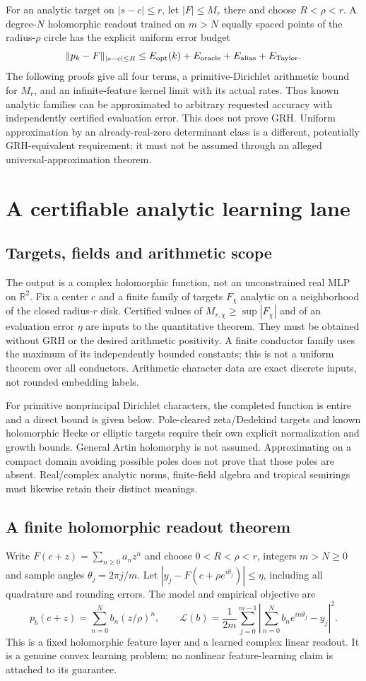 \documentclass[11pt]{article}
\theoremstyle{definition}\newtheorem{definition}[theorem]{Definition}
\theoremstyle{remark}\newtheorem{remark}[theorem]{Remark}
\begin{document}
For an analytic target on $|s-c|\le r$, let $|F|\le M_r$ there and choose
$R<\rho<r$. A degree-$N$ holomorphic readout trained on $m>N$ equally spaced
points of the radius-$\rho$ circle has the explicit uniform error budget
\[
 \|p_k-F\|_{|s-c|\le R}
 \le E_{\rm opt}(k)+E_{\rm oracle}+E_{\rm alias}+E_{\rm Taylor}.
\]
The following proofs give all four terms, a primitive-Dirichlet arithmetic
bound for $M_r$, and an infinite-feature kernel limit with its actual rates.
Thus known analytic families can be approximated to arbitrary requested
accuracy with independently certified evaluation error. This does not prove
GRH. Uniform approximation by an already-real-zero determinant class is a
different, potentially GRH-equivalent requirement; it must not be assumed
through an alleged universal-approximation theorem.

\section{A certifiable analytic learning lane}
\subsection{Targets, fields and arithmetic scope}
The output is a complex holomorphic function, not an unconstrained real MLP
on $\mathbb R^2$. Fix a center $c$ and a finite family of targets $F_\chi$
analytic on a neighborhood of the closed radius-$r$ disk. Certified values
of $M_{r,\chi}\ge\sup|F_\chi|$ and of an evaluation error $\eta$ are inputs
to the quantitative theorem. They must be obtained without GRH or the desired
arithmetic positivity. A finite conductor family uses the maximum of its
independently bounded constants; this is not a uniform theorem over all
conductors. Arithmetic character data are exact discrete inputs, not rounded
embedding labels.

For primitive nonprincipal Dirichlet characters, the completed function is
entire and a direct bound is given below. Pole-cleared zeta/Dedekind targets
and known holomorphic Hecke or elliptic targets require their own explicit
normalization and growth bounds. General Artin holomorphy is not assumed.
Approximating on a compact domain avoiding possible poles does not prove that
those poles are absent. Real/complex analytic norms, finite-field algebra and
tropical semirings must likewise retain their distinct meanings.

\subsection{A finite holomorphic readout theorem}
Write $F(c+z)=\sum_{n\ge0}a_nz^n$ and choose
$0<R<\rho<r$, integers $m>N\ge0$ and sample angles $\theta_j=2\pi j/m$.
Let $|y_j-F(c+\rho e^{i\theta_j})|\le\eta$, including all quadrature and
rounding errors. The model and empirical objective are
\[
 p_b(c+z)=\sum_{n=0}^N b_n(z/\rho)^n,\qquad
 \mathcal L(b)=\frac1{2m}\sum_{j=0}^{m-1}
 \left|\sum_{n=0}^Nb_ne^{in\theta_j}-y_j\right|^2.
\]
This is a fixed holomorphic feature layer and a learned complex linear
readout. It is a genuine convex learning problem; no nonlinear feature-learning
claim is attached to its guarantee.
\end{document}
